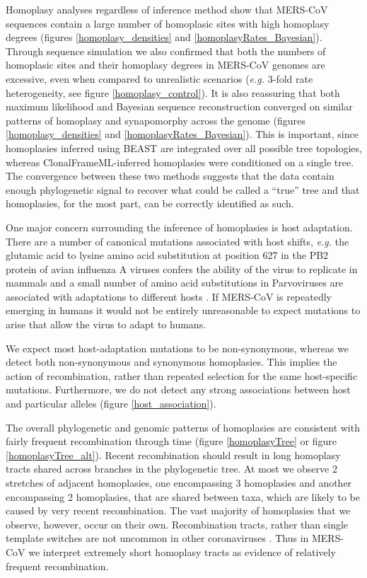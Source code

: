\documentclass[11pt,oneside,letterpaper]{article}
\begin{document}
Homoplasy analyses regardless of inference method show that MERS-CoV sequences contain a large number of homoplasic sites with high homoplasy degrees (figures \ref{homoplasy_densities} and \ref{homoplasyRates_Bayesian}).
Through sequence simulation we also confirmed that both the numbers of homoplasic sites and their homoplasy degrees in MERS-CoV genomes are excessive, even when compared to unrealistic scenarios (\textit{e.g.} 3-fold rate heterogeneity, see figure \ref{homoplasy_control}).
It is also reassuring that both maximum likelihood and Bayesian sequence reconstruction converged on similar patterns of homoplasy and synapomorphy across the genome (figures \ref{homoplasy_densities} and \ref{homoplasyRates_Bayesian}).
This is important, since homoplasies inferred using BEAST are integrated over all possible tree topologies, whereas ClonalFrameML-inferred homoplasies were conditioned on a single tree.
The convergence between these two methods suggests that the data contain enough phylogenetic signal to recover what could be called a ``true'' tree and that homoplasies, for the most part, can be correctly identified as such.

One major concern surrounding the inference of homoplasies is host adaptation.
There are a number of canonical mutations associated with host shifts, \textit{e.g.} the glutamic acid to lysine amino acid substitution at position 627 in the PB2 protein of avian influenza A viruses confers the ability of the virus to replicate in mammals \citep{subbarao_1993} and a small number of amino acid substitutions in Parvoviruses are associated with adaptations to different hosts \citep{chang_1992}.
If MERS-CoV is repeatedly emerging in humans it would not be entirely unreasonable to expect mutations to arise that allow the virus to adapt to humans.

We expect most host-adaptation mutations to be non-synonymous, whereas we detect both non-synonymous and synonymous homoplasies.
This implies the action of recombination, rather than repeated selection for the same host-specific mutations.
Furthermore, we do not detect any strong associations between host and particular alleles (figure \ref{host_association}).

The overall phylogenetic and genomic patterns of homoplasies are consistent with fairly frequent recombination through time (figure \ref{homoplasyTree} or figure \ref{homoplasyTree_alt}).
Recent recombination should result in long homoplasy tracts shared across branches in the phylogenetic tree.
At most we observe 2 stretches of adjacent homoplasies, one encompassing 3 homoplasies and another encompassing 2 homoplasies, that are shared between taxa, which are likely to be caused by very recent recombination.
The vast majority of homoplasies that we observe, however, occur on their own.
Recombination tracts, rather than single template switches are not uncommon in other coronaviruses \citep{keck_1988,kottier_1995,herrewegh_1998}.
Thus in MERS-CoV we interpret extremely short homoplasy tracts as evidence of relatively frequent recombination.
\end{document}
